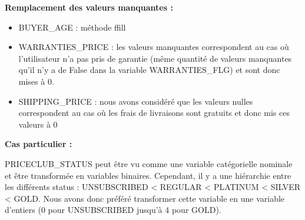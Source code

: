 \textbf{Remplacement des valeurs manquantes :}

\begin{itemize}
\item  BUYER_AGE : méthode ffill
\item WARRANTIES_PRICE : les valeurs manquantes correspondent au cas où l'utilisateur n'a 
pas pris de garantie (même quantité de valeurs manquantes qu'il n'y a de False dans la 
variable WARRANTIES_FLG) et sont donc mises à 0.
\item  SHIPPING_PRICE : nous avons considéré que les valeurs nulles correspondent au cas
où les frais de livraisons sont gratuits et donc mis ces valeurs à 0
\end{itemize}

\textbf{Cas particulier :}

PRICECLUB_STATUS peut être vu comme une variable catégorielle nominale et être transformée
en variables binaires. Cependant, il y a une hiérarchie entre les différents 
status : UNSUBSCRIBED < REGULAR < PLATINUM < SILVER < GOLD. Nous avons donc préféré transformer
cette variable en une variable d'entiers (0 pour UNSUBSCRIBED jusqu'à 4 pour GOLD).




